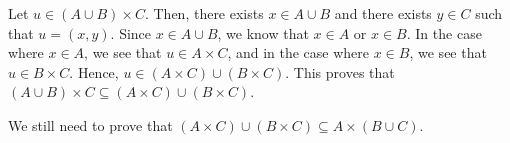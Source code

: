 \begin{list}{\bf{\ref{exer:sec44-4}.}}
\item Let  $u \in \left( {A \cup B} \right) \times C$. Then, there exists $x \in A \cup B$ and there exists  $y \in C$ such that  $u = \left( {x, y} \right)$.  Since  $x \in A \cup B$, we know that  $x \in A$  or  $x \in B$.  In the case where $x \in A$, we see that $u \in A \times C$, and in the case where $x \in B$, we see that $u \in B \times C$.  Hence, 
$u \in \left( A \times C \right) \cup \left( B \times C \right)$.  This proves that 
$\left( {A \cup B} \right) \times C \subseteq \left( {A \times C} \right) \cup \left( {B \times C} \right)$.

We still need to prove that $(A \times C) \cup (B \times C) \subseteq A \times (B \cup C)$.
\end{list}
\hbreak
\renewcommand{\labelenumi}{\textbf{\arabic{enumi}.}}

\endinput


